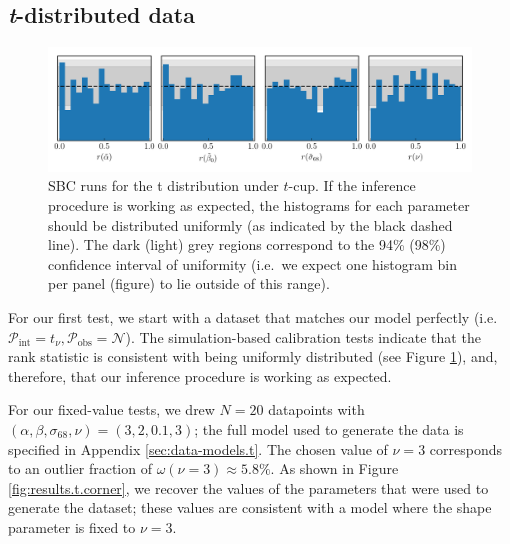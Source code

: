 \documentclass[fleqn,usenatbib]{rasti}
\begin{document}

\subsection{\textit{t}-distributed data}
\label{sec:results.t}

\begin{figure}
    \includegraphics[width=\textwidth]{graphics/sbc/tcup/t/sbc.pdf}
    \caption{SBC runs for the t distribution under $t$-cup. If the inference
    procedure is working as expected, the histograms for each parameter should
    be distributed uniformly (as indicated by the black dashed line). The dark
    (light) grey regions correspond to the 94\% (98\%) confidence interval of
    uniformity (i.e.\ we expect one histogram bin per panel (figure) to lie
    outside of this range).}
    \label{fig:results.t.sbc}
\end{figure}

For our first test, we start with a dataset that matches our model perfectly
(i.e.\ $\mathcal P_{\text{int}} = t_\nu, \mathcal P_{\text{obs}} = \mathcal{N}$).
The simulation-based calibration tests indicate that the rank statistic is
consistent with being uniformly distributed (see Figure
\ref{fig:results.t.sbc}), and, therefore, that our inference procedure is
working as expected.

For our fixed-value tests, we drew $N = 20$ datapoints with $(\alpha, \beta,
\sigma_{68}, \nu) = (3, 2, 0.1, 3)$; the full model used to generate the data is
specified in Appendix \ref{sec:data-models.t}. The chosen value of $\nu = 3$
corresponds to an outlier fraction of $\omega(\nu = 3) \approx 5.8 \%$.  As
shown in Figure \ref{fig:results.t.corner}, we recover the values of the
parameters that were used to generate the dataset; these values are consistent
with a model where the shape parameter is fixed to $\nu = 3$.
\end{document}
